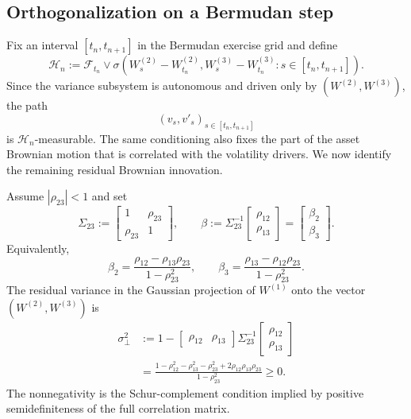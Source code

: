 \documentclass[pdflatex,sn-mathphys-num]{sn-jnl}
\theoremstyle{thmstyleone}%
\theoremstyle{thmstylethree}%
\theoremstyle{thmstyletwo}%
\newcommand{\F}{\mathcal F}
\begin{document}
\subsection{Orthogonalization on a Bermudan step}

Fix an interval $[t_n,t_{n+1}]$ in the Bermudan exercise grid and define
\[
\mathcal H_n
:=
\F_{t_n}
\vee
\sigma\!\left(
W_s^{(2)}-W_{t_n}^{(2)},
W_s^{(3)}-W_{t_n}^{(3)}
: s\in[t_n,t_{n+1}]
\right).
\]
Since the variance subsystem is autonomous and driven only by
$(W^{(2)},W^{(3)})$, the path
\[
(v_s,v'_s)_{s\in[t_n,t_{n+1}]}
\]
is $\mathcal H_n$-measurable. The same conditioning also fixes the part of the
asset Brownian motion that is correlated with the volatility drivers. We now
identify the remaining residual Brownian innovation.

Assume $|\rho_{23}|<1$ and set
\[
\Sigma_{23}:=
\begin{bmatrix}
1 & \rho_{23}\\
\rho_{23} & 1
\end{bmatrix},
\qquad
\beta:=\Sigma_{23}^{-1}
\begin{bmatrix}
\rho_{12}\\
\rho_{13}
\end{bmatrix}
=
\begin{bmatrix}
\beta_2\\
\beta_3
\end{bmatrix}.
\]
Equivalently,
\begin{equation}\label{eq:proj-coeffs}
\beta_2=\frac{\rho_{12}-\rho_{13}\rho_{23}}{1-\rho_{23}^2},
\qquad
\beta_3=\frac{\rho_{13}-\rho_{12}\rho_{23}}{1-\rho_{23}^2}.
\end{equation}
The residual variance in the Gaussian projection of $W^{(1)}$ onto the vector
$(W^{(2)},W^{(3)})$ is
\begin{equation}\label{eq:sigperp}
\begin{aligned}
\sigma_\perp^2
&:=
1-
\begin{bmatrix}\rho_{12}&\rho_{13}\end{bmatrix}
\Sigma_{23}^{-1}
\begin{bmatrix}\rho_{12}\\ \rho_{13}\end{bmatrix} \\
&=
\frac{
1-\rho_{12}^2-\rho_{13}^2-\rho_{23}^2
+2\rho_{12}\rho_{13}\rho_{23}
}{
1-\rho_{23}^2
}
\ge0.
\end{aligned}
\end{equation}
The nonnegativity is the Schur-complement condition implied by positive
semidefiniteness of the full correlation matrix.
\end{document}
